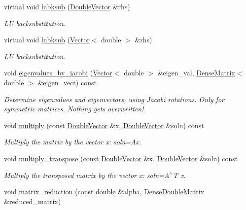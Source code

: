 \begin{DoxyCompactItemize}
virtual void \hyperlink{classoomph_1_1DenseDoubleMatrix_a52515653ab5b792388258ca04e9dcbcc}{lubksub} (\hyperlink{classoomph_1_1DoubleVector}{Double\+Vector} \&rhs)
\begin{DoxyCompactList}\small\item\em LU backsubstitution. \end{DoxyCompactList}\item 
virtual void \hyperlink{classoomph_1_1DenseDoubleMatrix_a0abbfbf61337d53ad1b239ba4431a47c}{lubksub} (\hyperlink{classoomph_1_1Vector}{Vector}$<$ double $>$ \&rhs)
\begin{DoxyCompactList}\small\item\em LU backsubstitution. \end{DoxyCompactList}\item 
void \hyperlink{classoomph_1_1DenseDoubleMatrix_aef56ba05f1ba190c3461cf27d57abd9d}{eigenvalues\+\_\+by\+\_\+jacobi} (\hyperlink{classoomph_1_1Vector}{Vector}$<$ double $>$ \&eigen\+\_\+val, \hyperlink{classoomph_1_1DenseMatrix}{Dense\+Matrix}$<$ double $>$ \&eigen\+\_\+vect) const
\begin{DoxyCompactList}\small\item\em Determine eigenvalues and eigenvectors, using Jacobi rotations. Only for symmetric matrices. Nothing gets overwritten! \end{DoxyCompactList}\item 
void \hyperlink{classoomph_1_1DenseDoubleMatrix_ab575dfefa0bdd8f495453baa5575a4a0}{multiply} (const \hyperlink{classoomph_1_1DoubleVector}{Double\+Vector} \&x, \hyperlink{classoomph_1_1DoubleVector}{Double\+Vector} \&soln) const
\begin{DoxyCompactList}\small\item\em Multiply the matrix by the vector x\+: soln=Ax. \end{DoxyCompactList}\item 
void \hyperlink{classoomph_1_1DenseDoubleMatrix_a7cc35997d87b4ee7b77fcaaf85eeeaec}{multiply\+\_\+transpose} (const \hyperlink{classoomph_1_1DoubleVector}{Double\+Vector} \&x, \hyperlink{classoomph_1_1DoubleVector}{Double\+Vector} \&soln) const
\begin{DoxyCompactList}\small\item\em Multiply the transposed matrix by the vector x\+: soln=A$^\wedge$T x. \end{DoxyCompactList}\item 
void \hyperlink{classoomph_1_1DenseDoubleMatrix_a64b81a329f8e9204e50b75ea367a77d4}{matrix\+\_\+reduction} (const double \&alpha, \hyperlink{classoomph_1_1DenseDoubleMatrix}{Dense\+Double\+Matrix} \&reduced\+\_\+matrix)

\end{DoxyCompactItemize}
